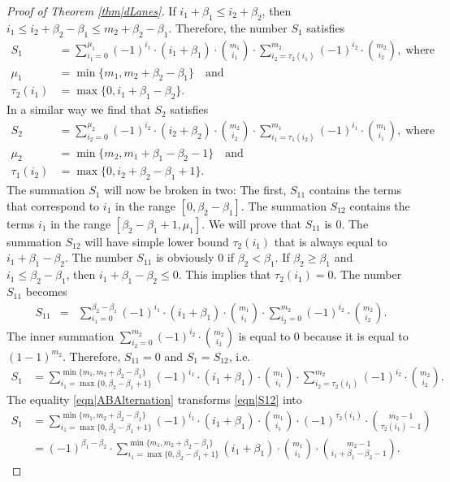 \documentclass[reqno]{amsart}
\begin{document}
\begin{appendix}
\begin{proof}[Proof of Theorem \ref{thm|dLanes}]
If $i_1+\beta_1\leq i_2+\beta_2$, then $i_1\leq i_2+\beta_2-\beta_1\leq m_2+\beta_2-\beta_1$. Therefore, the number $S_1$ satisfies
\begin{align}
S_1&=\sum_{i_1=0}^{\mu_1}(-1)^{i_1}\cdot (i_1+\beta_1)\cdot \binom{m_1}{i_1}\cdot \sum_{i_2=\tau_2(i_1)}^{m_2}(-1)^{i_2}\cdot\binom{m_2}{i_2}, \;\mbox{where}\quad \label{eqn|S1} \\
\mu_1&=\min\{m_1,m_2+\beta_2-\beta_1\}\quad \mbox{and }\nonumber\\
\tau_2(i_1)&=\max\{0,i_1+\beta_1-\beta_2\}.\nonumber 
\end{align}
In a similar way we find that $S_2$ satisfies  
\begin{align}
S_2&=\sum_{i_2=0}^{\mu_2}(-1)^{i_2}\cdot (i_2+\beta_2)\cdot \binom{m_2}{i_2}\cdot \sum_{i_1=\tau_1(i_2)}^{m_1}(-1)^{i_1}\cdot\binom{m_1}{i_1}, \;\mbox{where}\quad \label{eqn|S2} \\
\mu_2&=\min\{m_2,m_1+\beta_1-\beta_2-1\}\quad \mbox{and }\nonumber\\
\tau_1(i_2)&=\max\{0,i_2+\beta_2-\beta_1+1\}.\nonumber 
\end{align}
The summation $S_1$ will now be broken in two: The first, $S_{11}$ contains the terms that correspond to $i_1$ in the range $[0, \beta_2-\beta_1]$.  The summation $S_{12}$ contains the terms $i_1$ in the range $[\beta_2-\beta_1+1,\mu_1]$. We will prove that $S_{11}$ is $0$. The summation $S_{12}$ will have simple lower bound $\tau_2(i_1)$ that is always equal to $i_1+\beta_1-\beta_2$.
The number $S_{11}$ is obviously $0$ if $\beta_2<\beta_1$. If $\beta_2\geq\beta_1$ and $i_1\leq \beta_2-\beta_1$, then $i_1+\beta_1-\beta_2\leq 0$. This implies that $\tau_2(i_1)=0$. The number $S_{11}$ becomes 
\begin{eqnarray*}
S_{11}&=&\sum_{i_1=0}^{\beta_2-\beta_1}(-1)^{i_1}\cdot (i_1+\beta_1)\cdot \binom{m_1}{i_1}\cdot \sum_{i_2=0}^{m_2}(-1)^{i_2}\cdot\binom{m_2}{i_2}.
\end{eqnarray*}
The inner summation $\sum_{i_2=0}^{m_2}(-1)^{i_2}\cdot\binom{m_2}{i_2}$ is equal to $0$ because it is equal to $(1-1)^{m_2}$. Therefore, $S_{11}=0$ and $S_1=S_{12}$, i.e. 
\begin{align} 
S_1&=\sum_{i_1=\max\{0,\beta_2-\beta_1+1\}}^{\min\{m_1,m_2+\beta_2-\beta_1\}}(-1)^{i_1}\cdot (i_1+\beta_1)\cdot \binom{m_1}{i_1}\cdot \sum_{i_2=\tau_2(i_1)}^{m_2}(-1)^{i_2}\cdot\binom{m_2}{i_2}. \label{eqn|S12} 
\end{align}
The equality \eqref{eqn|ABAlternation} transforms \eqref{eqn|S12} into
\begin{align} 
S_1&=\sum_{i_1=\max\{0,\beta_2-\beta_1+1\}}^{\min\{m_1,m_2+\beta_2-\beta_1\}}(-1)^{i_1}\cdot (i_1+\beta_1)\cdot \binom{m_1}{i_1}\cdot  (-1)^{\tau_2(i_1)}\cdot \binom{m_2-1}{\tau_2(i_1)-1}\nonumber \\
&=(-1)^{\beta_1-\beta_2}\cdot \sum_{i_1=\max\{0,\beta_2-\beta_1+1\}}^{\min\{m_1,m_2+\beta_2-\beta_1\}}  (i_1+\beta_1)\cdot \binom{m_1}{i_1}\cdot  \binom{m_2-1}{i_1+\beta_1-\beta_2-1}.
 \label{eqn|S12S} 
\end{align}


\end{proof}
\end{appendix}
\end{document}
